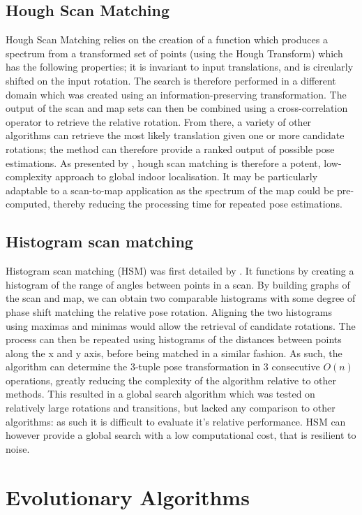 \documentclass[authoryearcitations]{UoYCSproject}
\begin{document}
\subsection{Hough Scan Matching}
Hough Scan Matching relies on the creation of a function which produces a spectrum from a transformed set of points (using the Hough Transform) which has the following properties; it is invariant to input translations, and is circularly shifted on the input rotation. The search is therefore performed in a different domain which was created using an information-preserving transformation. The output of the scan and map sets can then be combined using a cross-correlation operator to retrieve the relative rotation. From there, a variety of other algorithms can retrieve the most likely translation given one or more candidate rotations; the method can therefore provide a ranked output of possible pose estimations. As presented by \citet{Censi2005-iv}, hough scan matching is therefore a potent, low-complexity approach to global indoor localisation. It may be particularly adaptable to a scan-to-map application as the spectrum of the map could be pre-computed, thereby reducing the processing time for repeated pose estimations.

\subsection{Histogram scan matching}
Histogram scan matching (HSM) was first detailed by \citet{Weiss1994-ub}. It functions by creating a histogram of the range of angles between points in a scan. By building graphs of the scan and map, we can obtain two comparable histograms with some degree of phase shift matching the relative pose rotation. Aligning the two histograms using maximas and minimas would allow the retrieval of candidate rotations. The process can then be repeated using histograms of the distances between points along the x and y axis, before being matched in a similar fashion. As such, the algorithm can determine the 3-tuple pose transformation in 3 consecutive $O(n)$ operations, greatly reducing the complexity of the algorithm relative to other methods. This resulted in a global search algorithm which was tested on relatively large rotations and transitions, but lacked any comparison to other algorithms: as such it is difficult to evaluate it's relative performance. HSM can however provide a global search with a low computational cost, that is resilient to noise.

\section{Evolutionary Algorithms}
\label{sec:evo_approaches}
\end{document}
